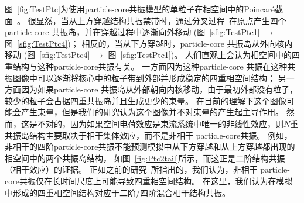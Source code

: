 图~\eqref{fig:TestPtc}为使用particle-core共振模型的单粒子在相空间中的Poincar\'{e}截面~\cite{27,li2015space}。
很显然，当从上方穿越结构共振禁带时，通过分叉过程~\cite{29,li2016nonlinear}在原点产生四个particle-core 共振岛，并在穿越过程中逐渐向外移动
(图~\eqref{sfig:TestPtc1} $\rightarrow$ 图~\eqref{sfig:TestPtc4})；
相反的，当从下方穿越时，particle-core 共振岛从外向核内移动
(图~\eqref{sfig:TestPtc4} $\rightarrow$ 图~\eqref{sfig:TestPtc1})。
人们直观上会认为相空间中的四重结构与这种particle-core共振有关。
一方面因为这种particle-core 共振在这种共振图像中可以逐渐将核心中的粒子带到外部并形成稳定的四重相空间结构；
另一方面因为如果particle-core 共振岛从外部朝向内核移动，由于最初外部没有粒子，较少的粒子会占据四重共振岛并且生成更少的束晕。
在目前的理解下这个图像可能会产生束晕，但是我们的研究认为这个图像并不对束晕的产生起主导作用。
然而，这是不对的，因为如果空间电荷效应是束流系统中唯一的非线性效应，则$N$重共振岛结构主要取决于相干集体效应，而不是非相干 particle-core共振。
例如，非相干的四阶particle-core共振不能预测模拟中从下方穿越和从上方穿越都出现的相空间中的两个共振岛结构，
如图~\eqref{fig:Ptc2tail}所示，而这正是二阶结构共振（相干效应）的证据。
正如之前的研究~\cite{li2014envelope}所指出的，我们认为，非相干 particle-core共振仅在长时间尺度上可能导致四重相空间结构。
在这里，我们认为在模拟中形成的四重相空间结构对应于二阶/四阶混合相干结构共振。

